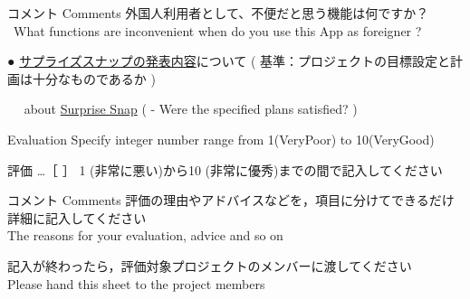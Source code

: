 \documentclass[a4,12pt]{jarticle}
\begin{document}
\begin{description}
\begin{itembox}[l]{コメント Comments}
\vspace*{-3mm} \hfill {\footnotesize
外国人利用者として、不便だと思う機能は何ですか？
} \vspace*{-2mm} \\
\hfill {\ What functions are inconvenient when do you use this App as foreigner ?}
\vspace{45mm}
\end{itembox}

\item{●} \underline{サプライズスナップの発表内容}について
{\footnotesize ( 基準：プロジェクトの目標設定と計画は十分なものであるか )}
\vspace*{-4mm}
\item{　} about \underline{Surprise Snap}
{\footnotesize ( - Were the specified plans satisfied? )}
\begin{description}
\item{}  Evaluation \hspace{19mm}
{\footnotesize  Specify integer number range from {\normalsize 1}(VeryPoor)
to {\normalsize 10}(VeryGood)}
\vspace*{-3mm}
\item{}  評価 …［ \hspace{10mm} ］\hspace{5mm}
{\footnotesize {\normalsize 1} (非常に悪い)から{\normalsize 10} (非常に優秀)までの間で記入してください}
\vspace{-3mm}
\end{description}

\begin{itembox}[l]{コメント Comments}
\vspace*{-3mm} \hfill {\footnotesize
評価の理由やアドバイスなどを，項目に分けてできるだけ詳細に記入してください
} \vspace*{-2mm} \\
\hfill {\footnotesize The reasons for your evaluation, advice and so on}
\vspace{45mm}
\end{itembox}

\end{description}

\vfill

\hfill 記入が終わったら，評価対象プロジェクトのメンバーに渡してください \\
\hfill Please hand this sheet to the project members
\end{document}
